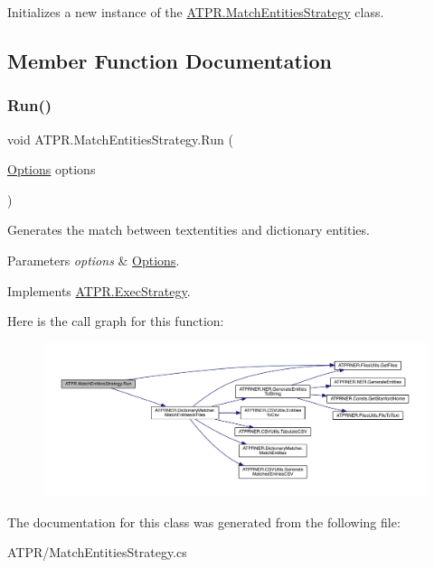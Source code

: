 Initializes a new instance of the \hyperlink{class_a_t_p_r_1_1_match_entities_strategy}{A\+T\+P\+R.\+Match\+Entities\+Strategy} class. 



\subsection{Member Function Documentation}
\hypertarget{class_a_t_p_r_1_1_match_entities_strategy_a7494fa761f1e14c463b4c6e5614ae1c4}{}\label{class_a_t_p_r_1_1_match_entities_strategy_a7494fa761f1e14c463b4c6e5614ae1c4} 
\subsubsection{\texorpdfstring{Run()}{Run()}}
{\footnotesize\ttfamily void A\+T\+P\+R.\+Match\+Entities\+Strategy.\+Run (\begin{DoxyParamCaption}\item[{\hyperlink{class_a_t_p_r_1_1_options}{Options}}]{options }\end{DoxyParamCaption})\hspace{0.3cm}{\ttfamily [inline]}}



Generates the match between textentities and dictionary entities. 


\begin{DoxyParams}{Parameters}
{\em options} & \hyperlink{class_a_t_p_r_1_1_options}{Options}.\\
\hline
\end{DoxyParams}


Implements \hyperlink{interface_a_t_p_r_1_1_exec_strategy}{A\+T\+P\+R.\+Exec\+Strategy}.

Here is the call graph for this function\+:
\nopagebreak
\begin{figure}[H]
\begin{center}
\leavevmode
\includegraphics[width=350pt]{df/db7/class_a_t_p_r_1_1_match_entities_strategy_a7494fa761f1e14c463b4c6e5614ae1c4_cgraph}
\end{center}
\end{figure}


The documentation for this class was generated from the following file\+:\begin{DoxyCompactItemize}
\item 
A\+T\+P\+R/Match\+Entities\+Strategy.\+cs\end{DoxyCompactItemize}
